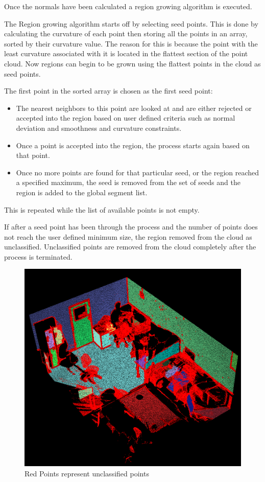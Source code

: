 		Once the normals have been calculated a region growing algorithm is executed.
		
		The Region growing algorithm starts off by selecting seed points. This is done by calculating the curvature of each point then storing all the points in an array, sorted by their curvature value. The reason for this is because the point with the least curvature associated with it is located in the flattest section of the point cloud. Now regions can begin to be grown using the flattest points in the cloud as seed points. 
		
		The first point in the sorted array is chosen as the first seed point:
		
		\begin{itemize}
			
			\item The nearest neighbors to this point are looked at and are either rejected or accepted into the region based on user defined criteria such as normal deviation and smoothness and curvature constraints.
			
			\item Once a point is accepted into the region, the process starts again based on that point.
			
			\item Once no more points are found for that particular seed, or the region reached a specified maximum, the seed is removed from the set of seeds and the region is added to the global segment list. 
			
		\end{itemize}
		
		This is repeated while the list of available points is not empty.
		
		If after a seed point has been through the process and the number of points does not reach the user defined minimum size, the region removed from the cloud as unclassified. Unclassified points are removed from the cloud completely after the process is terminated.
		
		\begin{figure}[H]
			\centering
			\includegraphics[width=0.6\linewidth]{Includes/images/GrownRegions}
			\caption{Red Points represent unclassified points}
			\label{fig:GrownRegions}
		\end{figure}
		
